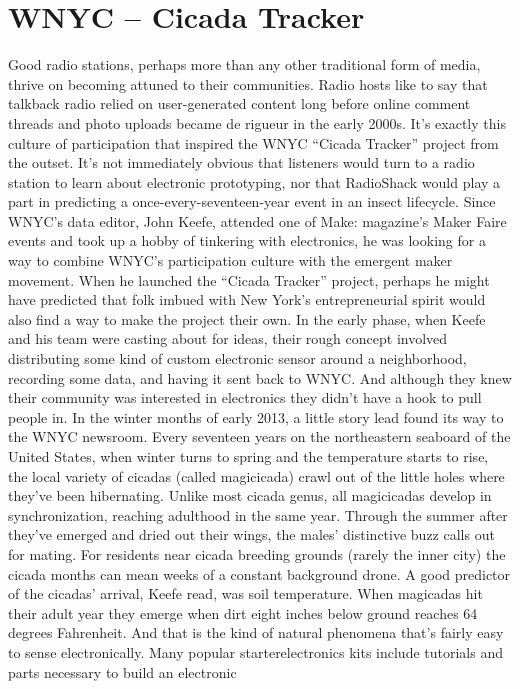 \section{WNYC – Cicada Tracker}
Good radio stations, perhaps more than any other traditional form of media,
thrive on becoming attuned to their communities. Radio hosts like to say
that talkback radio relied on user-generated content long before online
comment threads and photo uploads became de rigueur in the early 2000s.
It's exactly this culture of participation that inspired the WNYC ``Cicada
Tracker'' project from the outset.
It's not immediately obvious that listeners would turn to a radio station to
learn about electronic prototyping, nor that RadioShack would play a part
in predicting a once-every-seventeen-year event in an insect lifecycle. Since
WNYC's data editor, John Keefe, attended one of Make: magazine's Maker
Faire events and took up a hobby of tinkering with electronics, he was looking
for a way to combine WNYC's participation culture with the emergent
maker movement. When he launched the ``Cicada Tracker'' project, perhaps
he might have predicted that folk imbued with New York's entrepreneurial
spirit would also find a way to make the project their own.
In the early phase, when Keefe and his team were casting about for ideas,
their rough concept involved distributing some kind of custom electronic
sensor around a neighborhood, recording some data, and having it sent
back to WNYC. And although they knew their community was interested
in electronics they didn't have a hook to pull people in.
In the winter months of early 2013, a little story lead found its way to the
WNYC newsroom. Every seventeen years on the northeastern seaboard of
the United States, when winter turns to spring and the temperature starts
to rise, the local variety of cicadas (called magicicada) crawl out of the little
holes where they've been hibernating. Unlike most cicada genus, all magicicadas
develop in synchronization, reaching adulthood in the same year.
Through the summer after they've emerged and dried out their wings, the
males' distinctive buzz calls out for mating. For residents near cicada breeding
grounds (rarely the inner city) the cicada months can mean weeks of a
constant background drone.
A good predictor of the cicadas' arrival, Keefe read, was soil temperature.
When magicadas hit their adult year they emerge when dirt eight inches
below ground reaches 64 degrees Fahrenheit. And that is the kind of natural
phenomena that's fairly easy to sense electronically. Many popular starterelectronics
kits include tutorials and parts necessary to build an electronic
